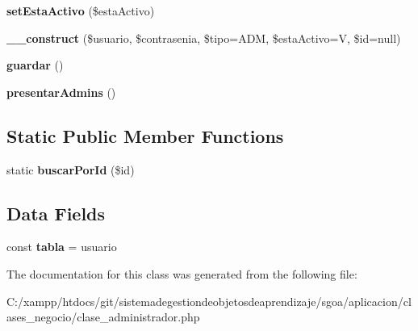 \begin{DoxyCompactItemize}
{\bfseries set\+Esta\+Activo} (\$esta\+Activo)
\item 
\mbox{\label{class_administrador_ab0c2edaf3b8fc9898f74d2cd821acaaa}} 
{\bfseries \+\_\+\+\_\+construct} (\$usuario, \$contrasenia, \$tipo=\textquotesingle{}A\+DM\textquotesingle{}, \$esta\+Activo=\textquotesingle{}V\textquotesingle{}, \$id=null)
\item 
\mbox{\label{class_administrador_a7eff1139ff047569a4d8bff22dfaee0c}} 
{\bfseries guardar} ()
\item 
\mbox{\label{class_administrador_a804dc6dc2fe1206778036ac9bf6f4947}} 
{\bfseries presentar\+Admins} ()
\end{DoxyCompactItemize}
\subsection*{Static Public Member Functions}
\begin{DoxyCompactItemize}
\item 
\mbox{\label{class_administrador_a44bf2207d08435f206481d8e4358876a}} 
static {\bfseries buscar\+Por\+Id} (\$id)
\end{DoxyCompactItemize}
\subsection*{Data Fields}
\begin{DoxyCompactItemize}
\item 
\mbox{\label{class_administrador_ac0414ee341593c7a07644267c5c67728}} 
const {\bfseries tabla} = \textquotesingle{}usuario\textquotesingle{}
\end{DoxyCompactItemize}


The documentation for this class was generated from the following file\+:\begin{DoxyCompactItemize}
\item 
C\+:/xampp/htdocs/git/sistemadegestiondeobjetosdeaprendizaje/sgoa/aplicacion/clases\+\_\+negocio/clase\+\_\+administrador.\+php\end{DoxyCompactItemize}
